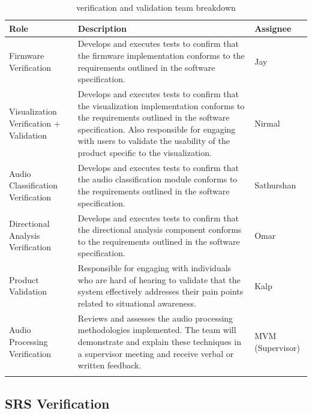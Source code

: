 \documentclass[12pt, titlepage]{article}
\begin{document}
\begin{longtable}{|p{4cm}|p{6cm}|p{2cm}|}
\hline
\textbf{Role} & \textbf{Description} & \textbf{Assignee} \\
\hline
Firmware Verification \label{role:firmware_verfication} & Develops and executes
tests to confirm that the firmware implementation conforms to the requirements
outlined in the software specification. & Jay \\
\hline

Visualization Verification + Validation \label{role:visual_vnv}& Develops and
executes tests to confirm that the visualization implementation conforms to the
requirements outlined in the software specification. Also responsible for
engaging with users to validate the usability of the product specific to the
visualization. & Nirmal \\
\hline

Audio Classification Verification \label{role:classification_verfication} &
Develops and executes tests to confirm that the audio classification module
conforms to the requirements outlined in the software specification. &
Sathurshan \\
\hline

Directional Analysis Verification \label{role:directional_verfication}& Develops
and executes tests to confirm that the directional analysis component conforms
to the requirements outlined in the software specification. & Omar \\
\hline

Product Validation \label{role:product_validation} & Responsible for engaging
with individuals who are hard of hearing to validate that the system effectively
addresses their pain points related to situational awareness. & Kalp \\
\hline

Audio Processing Verification \label{role:audio_processing_verification}  &
Reviews and assesses the audio processing methodologies implemented. The team
will demonstrate and explain these techniques in a supervisor meeting and
receive verbal or written feedback. & MVM (Supervisor) \\
\hline

\caption{verification and validation team breakdown} \label{table:vnv_team}
\end{longtable}

\subsection{SRS Verification}\label{sec:srs_verification}
\end{document}
